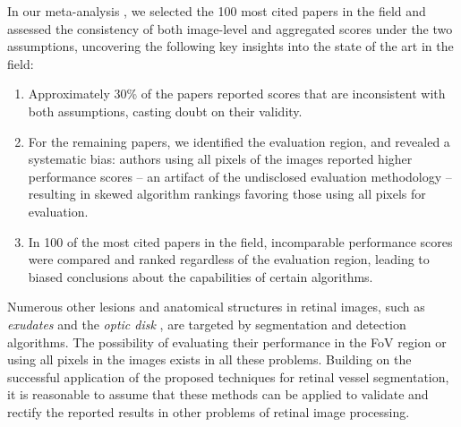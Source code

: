 \documentclass[3p, times]{elsarticle}
\begin{document}

In our meta-analysis \cite{vessel}, we selected the 100 most cited papers in the field and assessed the consistency of both image-level and aggregated scores under the two assumptions, uncovering the following key insights into the state of the art in the field:
\begin{enumerate}
    \item Approximately 30\% of the papers reported scores that are inconsistent with both assumptions, casting doubt on their validity.
    \item For the remaining papers, we identified the evaluation region, and revealed a systematic bias: authors using all pixels of the images reported higher performance scores -- an artifact of the undisclosed evaluation methodology -- resulting in skewed algorithm rankings favoring those using all pixels for evaluation. 
    \item In 100 of the most cited papers in the field, incomparable performance scores were compared and ranked regardless of the evaluation region, leading to biased conclusions about the capabilities of certain algorithms.
\end{enumerate}


Numerous other lesions and anatomical structures in retinal images, such as \emph{exudates} \cite{exu} and the \emph{optic disk} \cite{od}, are targeted by segmentation and detection algorithms. The possibility of evaluating their performance in the FoV region or using all pixels in the images exists in all these problems. Building on the successful application of the proposed techniques for retinal vessel segmentation, it is reasonable to assume that these methods can be applied to validate and rectify the reported results in other problems of retinal image processing.
\end{document}
